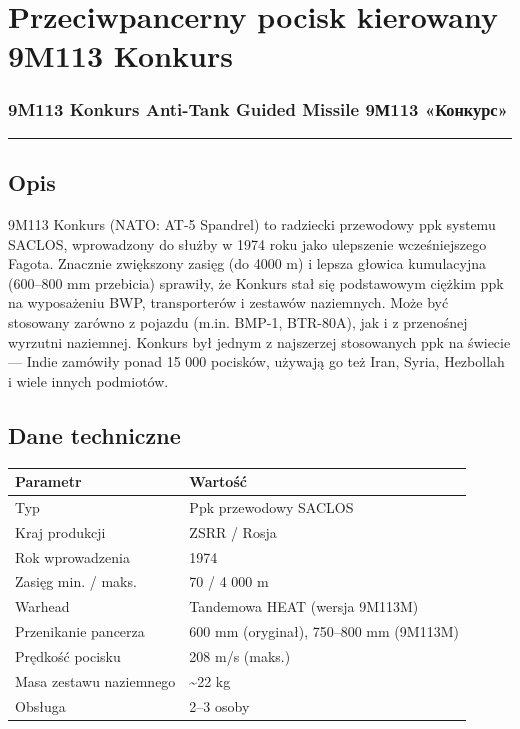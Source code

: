 \documentclass[12pt,openany,oneside]{book}
\begin{document}
\chapter{Przeciwpancerny pocisk kierowany 9M113
Konkurs}\label{przeciwpancerny-pocisk-kierowany-9m113-konkurs}

\subsection{9M113 Konkurs Anti-Tank Guided Missile \textbar{} 9М113
«Конкурс»}\label{m113-konkurs-anti-tank-guided-missile-9ux43c113-ux43aux43eux43dux43aux443ux440ux441}

\begin{center}\rule{0.5\linewidth}{0.5pt}\end{center}

\section{Opis}\label{opis-35}

9M113 Konkurs (NATO: AT-5 Spandrel) to radziecki przewodowy ppk systemu
SACLOS, wprowadzony do służby w 1974 roku jako ulepszenie wcześniejszego
Fagota. Znacznie zwiększony zasięg (do 4000 m) i lepsza głowica
kumulacyjna (600--800 mm przebicia) sprawiły, że Konkurs stał się
podstawowym ciężkim ppk na wyposażeniu BWP, transporterów i zestawów
naziemnych. Może być stosowany zarówno z pojazdu (m.in. BMP-1, BTR-80A),
jak i z przenośnej wyrzutni naziemnej. Konkurs był jednym z najszerzej
stosowanych ppk na świecie --- Indie zamówiły ponad 15 000 pocisków,
używają go też Iran, Syria, Hezbollah i wiele innych podmiotów.

\section{Dane techniczne}\label{dane-techniczne-35}

\begin{longtable}[]{@{}ll@{}}
\toprule\noalign{}
Parametr & Wartość \\
\midrule\noalign{}
\endhead
\bottomrule\noalign{}
\endlastfoot
Typ & Ppk przewodowy SACLOS \\
Kraj produkcji & ZSRR / Rosja \\
Rok wprowadzenia & 1974 \\
Zasięg min. / maks. & 70 / 4 000 m \\
Warhead & Tandemowa HEAT (wersja 9M113M) \\
Przenikanie pancerza & 600 mm (oryginał), 750--800 mm (9M113M) \\
Prędkość pocisku & 208 m/s (maks.) \\
Masa zestawu naziemnego & \textasciitilde22 kg \\
Obsługa & 2--3 osoby \\
\end{longtable}
\end{document}
